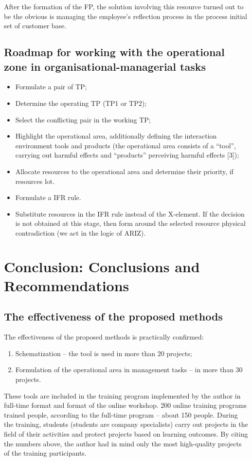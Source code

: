 \documentclass[11pt,a4paper]{book}
\begin{document}
After the formation of the FP, the solution involving this resource turned out
to be the obvious is managing the employee’s reflection process in the process
initial set of customer base.

\section[Roadmap]{Roadmap for working with the operational zone in 
  organisational-managerial tasks}

\begin{itemize}
\item Formulate a pair of TP;
\item Determine the operating TP (TP1 or TP2);
\item Select the conflicting pair in the working TP;
\item Highlight the operational area, additionally defining the interaction
  environment tools and products (the operational area consists of a “tool”,
  carrying out harmful effects and “products” perceiving harmful effects [3]);
\item Allocate resources to the operational area and determine their priority,
  if resources lot.
\item Formulate a IFR rule.
\item Substitute resources in the IFR rule instead of the X-element. If the
  decision is not obtained at this stage, then form around the selected
  resource physical contradiction (we act in the logic of ARIZ).
\end{itemize}

\chapter{Conclusion: Conclusions and Recommendations}

\section{The effectiveness of the proposed methods}

The effectiveness of the proposed methods is practically confirmed:
\begin{enumerate}
\item Schematization -- the tool is used in more than 20 projects;
\item Formulation of the operational area in management tasks -- in more than
  30 projects.
\end{enumerate}
These tools are included in the training program implemented by the author in
full-time format and format of the online workshop. 200 online training
programs trained people, according to the full-time program -- about 150
people.  During the training, students (students are company specialists)
carry out projects in the field of their activities and protect projects based
on learning outcomes. By citing the numbers above, the author had in mind only
the most high-quality projects of the training participants.
\end{document}
